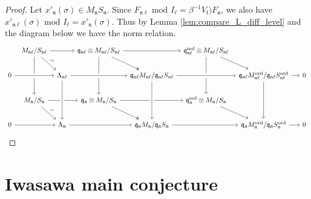 \documentclass[leqno]{amsart}
\theoremstyle{definition}
\theoremstyle{remark}
\newcommand{\fn}{\mathfrak{n}}
\newcommand{\fl}{\mathfrak{l}}
\newcommand{\fq}{\mathfrak{q}}
\newcommand{\red}{\textnormal{red}}
\newcommand{\ord}{\textnormal{ord}} %
\begin{document}
\begin{proof}

Let $x'_{\fn}(\sigma)\in M_{\fn}S_{\fn}$.
Since $F_{\fn\ell}\text{ mod }I_\ell=
\beta^{-1}V_\fl)F_\fn$,
we also have 
$x'_{\fn\ell}(\sigma)\text{ mod }I_\ell
=x'_\fn(\sigma)$.
Thus by Lemma \ref{lem:compare_L_diff_level}
and the diagram below
we have the norm relation.
\begin{equation*}
\begin{tikzcd}[column sep=tiny]
& M_{\fn\ell}/S_{\fn\ell}\arrow{dd} \arrow[rd,"\sim"]\arrow[rr]
&& \fq_{\fn\ell}\otimes M_{\fn\ell}/S_{\fn\ell}
	\arrow[rd,twoheadrightarrow]\arrow[rr]\arrow[dd]
&& \fq_{\fn\ell}^{\red}\otimes M_{\fn\ell}/S_{\fn\ell}\arrow[dd]\arrow[rd]\\
0 \arrow[crossing over]{rr} 
&& \Lambda_{\fn\ell}
	\arrow[crossing over]{dd} \arrow[crossing over]{rr} 
&& \fq_{\fn\ell}M_{\fn\ell}/\fq_{\fn\ell}S_{\fn\ell}
	\arrow[crossing over]{dd}\arrow[crossing over]{rr} 
&& \fq_{\fn\ell}M_{\fn\ell}^{\ord}/\fq_{\fn\ell}S^{\ord}_{\fn\ell}
	\arrow{dd} \arrow[rr] && 0\\
& M_{\fn}/S_{\fn}\arrow{rr}\arrow[rd,"\sim"]
&& \fq_{\fn}\otimes M_{\fn}/S_{\fn}
	\arrow{rr} \arrow[rd,twoheadrightarrow]
&& \fq_{\fn}^{\red}\otimes M_{\fn}/S_{\fn} \arrow[rd]& & & \\
0 \arrow[crossing over]{rr} 
&& \Lambda_{\fn} \arrow[crossing over]{rr} 
&& \fq_{\fn}M_{\fn}/\fq_{\fn}S_{\fn}\arrow[crossing over]{rr} 
&& \fq_{\fn}M_{\fn}^{\ord}/\fq_{\fn}S_{\fn}^{\ord} \arrow[rr] && 0
\arrow[from=2-3,to=4-3,crossing over]
\arrow[from=2-5,to=4-5,crossing over]
\end{tikzcd}
\end{equation*}

	
\end{proof}


\section{Iwasawa main conjecture}
\end{document}

